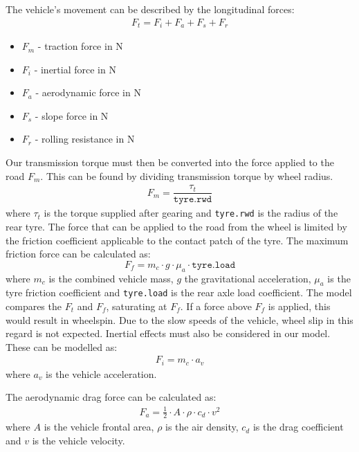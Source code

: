 \documentclass[11pt]{article}
\numberwithin{equation}{section}
\begin{document}
The vehicle's movement can be described by the longitudinal forces:
\begin{gather}
    F_t = F_i + F_a + F_s + F_r \label{forces1}
\end{gather}
\begin{itemize}
    \item $F_m$ - traction force in \si{\newton}
    \item $F_i$ - inertial force in \si{\newton}
    \item $F_a$ - aerodynamic force in \si{\newton}
    \item $F_s$ - slope force in \si{\newton}
    \item $F_r$ - rolling resistance in \si{\newton}
\end{itemize}
Our transmission torque must then be converted into the force applied to the road $F_m$. This can be found by dividing transmission torque by wheel radius. 
\begin{gather}
    F_m = \dfrac{\tau_t}{\texttt{tyre.rwd}}
\end{gather}
where $\tau_t$ is the torque supplied after gearing and \texttt{tyre.rwd} is the radius of the rear tyre. The force that can be applied to the road from the wheel is limited by the friction coefficient applicable to the contact patch of the tyre. The maximum friction force can be calculated as:
\begin{equation}
    F_f = m_c \cdot g \cdot \mu_a\cdot \texttt{tyre.load} 
\end{equation}
where $m_c$ is the combined vehicle mass, $g$ the gravitational acceleration, $\mu_a$ is the tyre friction coefficient and \texttt{tyre.load} is the rear axle load coefficient. The model compares the $F_t$ and $F_f$, saturating at $F_f$. If a force above $F_f$ is applied, this would result in wheelspin. Due to the slow speeds of the vehicle, wheel slip in this regard is not expected.
Inertial effects must also be considered in our model. These can be modelled as:
\begin{gather}
    F_i = m_c \cdot a_v \label{forces2}
\end{gather}
where $a_v$ is the vehicle acceleration.

The aerodynamic drag force can be calculated as:
\begin{gather}
    F_a = \frac{1}{2} \cdot A \cdot \rho \cdot c_d \cdot v^2
\end{gather}
where $A$ is the vehicle frontal area, $\rho$ is the air density, $c_d$ is the drag coefficient and $v$ is the vehicle velocity.
\end{document}
